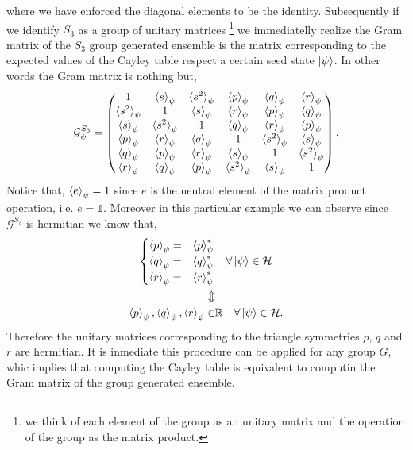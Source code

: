 \documentclass[12pt,letterpaper]{article}
\begin{document}
\begin{multicols}{2}
where we have enforced the diagonal elements to be the identity. Subsequently if we identify $S_3$ as a group of unitary matrices \footnote{we think of each element of the group as an unitary matrix and the operation of the group as the matrix product.} we immediatelly realize the Gram matrix of the $S_3$ group generated ensemble is the matrix corresponding to the expected values of the Cayley table respect a certain seed state $\ket{\psi}$. In other words the Gram matrix is nothing but,
\begin{align*}
	\mathcal{G}^{S_3}_{\psi}=\begin{pmatrix}
        1 & \braket{s}_\psi & \braket{s^2}_\psi & \braket{p}_\psi & \braket{q}_\psi & \braket{r}_\psi \\ 
        \braket{s^2}_\psi & 1 & \braket{s}_\psi & \braket{r}_\psi & \braket{p}_\psi & \braket{q}_\psi \\
        \braket{s}_\psi & \braket{s^2}_\psi & 1 & \braket{q}_\psi & \braket{r}_\psi & \braket{p}_\psi \\
        \braket{p}_\psi & \braket{r}_\psi & \braket{q}_\psi & 1 & \braket{s^2}_\psi & \braket{s}_\psi \\
        \braket{q}_\psi & \braket{p}_\psi & \braket{r}_\psi & \braket{s}_\psi & 1 & \braket{s^2}_\psi \\
        \braket{r}_\psi & \braket{q}_\psi & \braket{p}_\psi & \braket{s^2}_\psi & \braket{s}_\psi & 1
	\end{pmatrix}.
\end{align*}
Notice that, $\braket{e}_\psi=1$ since $e$ is the neutral element of the matrix product operation, i.e. $e=\mathds{1}$. Moreover in this particular example we can observe since $\mathcal{G}^{S_3}$ is hermitian we know that,
\begin{align*}\begin{cases}
	\braket{p}_{\psi}=&\braket{p}_{\psi}^*\\
	\braket{q}_{\psi}=&\braket{q}_{\psi}^*\\
\braket{r}_{\psi}=&\braket{r}_{\psi}^*\end{cases}&\quad \forall \ket{\psi}\in \mathcal{H}\\
\Updownarrow& \\
\braket{p}_{\psi},\braket{q}_{\psi},\braket{r}_{\psi}\in&\mathbb{R}\quad \forall \ket{\psi}\in \mathcal{H}.
\end{align*}
Therefore the unitary matrices corresponding to the triangle symmetries $p$, $q$ and $r$ are hermitian. It is inmediate this procedure can be applied for any group $G$, whic implies that computing the Cayley table is equivalent to computin the Gram matrix of the group generated ensemble.


\end{multicols}
\end{document}
